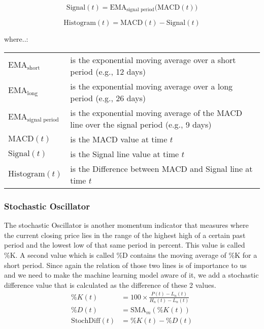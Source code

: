 \documentclass[a4paper,12pt]{report}
\begin{document}
\begin{equation}
\text{Signal}(t) = \text{EMA}_{\text{signal period}} \big(\text{MACD}(t)\big)
\end{equation}

\begin{equation}
\text{Histogram}(t) = \text{MACD}(t) - \text{Signal}(t)
\end{equation}

where..:\\

\begin{tabularx}{\textwidth}{@{}l@{\hspace{2em}--\hspace{2em}}X@{}}
  $\text{EMA}_{\text{short}}$       & is the exponential moving average over a short period (e.g., 12 days) \\
  $\text{EMA}_{\text{long}}$        & is the exponential moving average over a long period (e.g., 26 days) \\
  $\text{EMA}_{\text{signal period}}$ & is the exponential moving average of the MACD line over the signal period (e.g., 9 days) \\
  $\text{MACD}(t)$                  & is the MACD value at time $t$ \\
  $\text{Signal}(t)$                & is the Signal line value at time $t$ \\
  $\text{Histogram}(t)$             & is the Difference between MACD and Signal line at time $t$ \\
\end{tabularx}

			\subsubsection{Stochastic Oscillator}
			
The stochastic Oscillator is another momentum indicator that measures where the current closing price lies in the range of the highest high of a certain past period and the lowest low of that same period in percent. This value is called \%K. A second value which is called \%D contains the moving average of \%K for a short period. Since again the relation of those two lines is of importance to us and we need to make the machine learning model aware of it, we add a stochastic difference value that is calculated as the difference of these 2 values. \cite{25}\\

\begin{equation}
\begin{aligned}
  \%K(t) &= 100 \times \frac{P(t) - L_n(t)}{H_n(t) - L_n(t)}  \\
  \%D(t) &= \text{SMA}_m(\%K(t))\\
  \text{StochDiff}(t) &= \%K(t) - \%D(t)\\
\end{aligned}
\end{equation}
\end{document}
